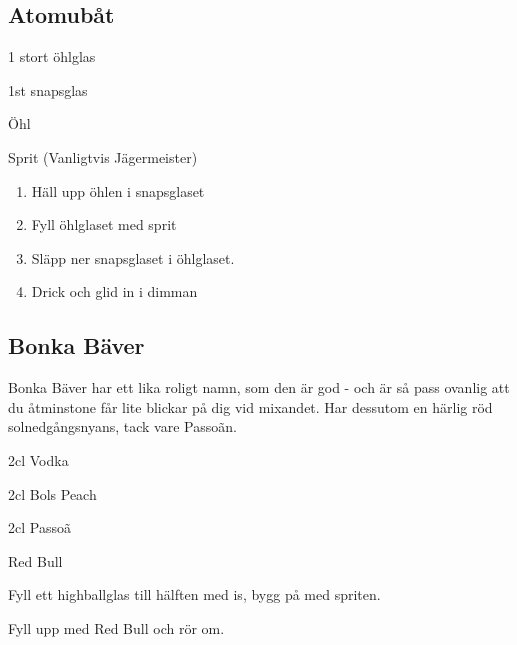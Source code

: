 \subsection{\textbf{Atomubåt}}

1 stort öhlglas

1st snapsglas

Öhl

Sprit (Vanligtvis Jägermeister)

\begin{enumerate}
    \item Häll upp öhlen i snapsglaset
    \item Fyll öhlglaset med sprit
    \item Släpp ner snapsglaset i öhlglaset.
    \item Drick och glid in i dimman
\end{enumerate}

\subsection{\textbf{Bonka Bäver}}

Bonka Bäver har ett lika roligt namn, som den är god - och är så pass ovanlig att du åtminstone får lite blickar på dig vid mixandet. Har dessutom en härlig röd solnedgångsnyans, tack vare Passoãn.

2cl Vodka

2cl Bols Peach

2cl Passoã

Red Bull

Fyll ett highballglas till hälften med is, bygg på med spriten.

Fyll upp med Red Bull och rör om.

\newpage